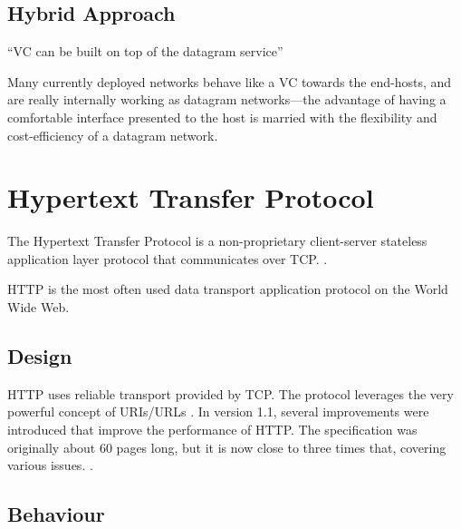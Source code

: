 \documentclass[10pt]{report}
\begin{document}
\section{Hybrid Approach}

``VC can be built on top of the datagram service'' \cite[p141]{russell}

Many currently deployed networks behave like a VC towards the end-hosts,
and are really internally working as datagram networks---the advantage
of having a comfortable interface presented to the host is married with
the flexibility and cost-efficiency of a datagram network.




\chapter{Hypertext Transfer Protocol}
\thispagestyle{fancy}

The Hypertext Transfer Protocol is a non-proprietary client-server
stateless application layer protocol that communicates over TCP.
\cite{rfc1945} \cite{rfc2616}.
\cite[pp122--124]{kurose}

HTTP is the most often used data transport application protocol on the
World Wide Web.

\section{Design}

HTTP uses reliable transport provided by TCP.  The protocol leverages
the very powerful concept of URIs/URLs \cite{rfc1738}.  In version 1.1,
several improvements were introduced that improve the performance of
HTTP.  The specification was originally about 60 pages long, but it is
now close to three times that, covering various issues. \cite{rfc2616}.

\section{Behaviour}
\end{document}
